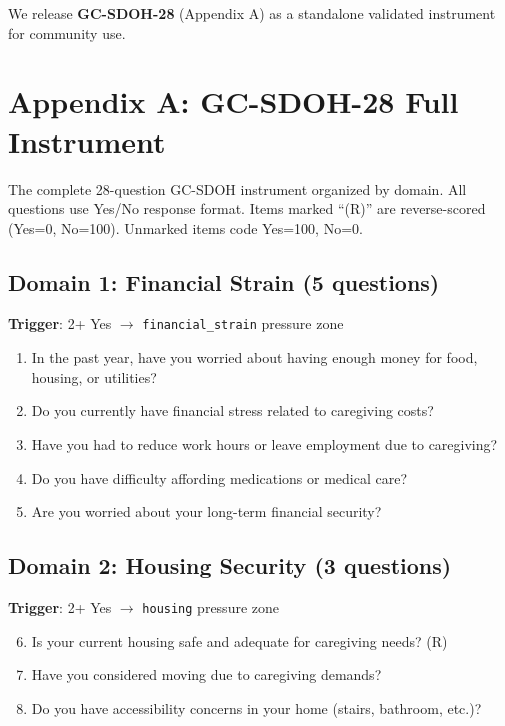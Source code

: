 \documentclass{article}
\begin{document}
We release \textbf{GC-SDOH-28} (Appendix A) as a standalone validated instrument for community use.

%
\section*{Appendix A: GC-SDOH-28 Full Instrument}

The complete 28-question GC-SDOH instrument organized by domain. All questions use Yes/No response format. Items marked ``(R)'' are reverse-scored (Yes=0, No=100). Unmarked items code Yes=100, No=0.

\subsection*{Domain 1: Financial Strain (5 questions)}
\textbf{Trigger}: 2+ Yes $\rightarrow$ \texttt{financial\_strain} pressure zone

\begin{enumerate}
    \item In the past year, have you worried about having enough money for food, housing, or utilities?
    \item Do you currently have financial stress related to caregiving costs?
    \item Have you had to reduce work hours or leave employment due to caregiving?
    \item Do you have difficulty affording medications or medical care?
    \item Are you worried about your long-term financial security?
\end{enumerate}

\subsection*{Domain 2: Housing Security (3 questions)}
\textbf{Trigger}: 2+ Yes $\rightarrow$ \texttt{housing} pressure zone

\begin{enumerate}
    \setcounter{enumi}{5}
    \item Is your current housing safe and adequate for caregiving needs? (R)
    \item Have you considered moving due to caregiving demands?
    \item Do you have accessibility concerns in your home (stairs, bathroom, etc.)?
\end{enumerate}
\end{document}
